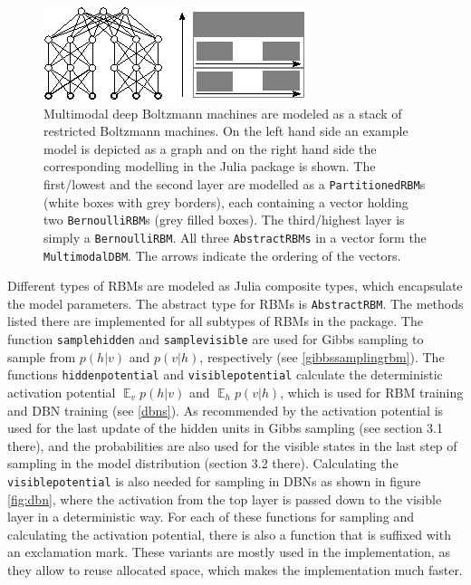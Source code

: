 \documentclass[12pt]{article}
\newcommand{\inlinecode}[1]{\texttt{#1}}
\DeclareMathOperator{\EX}{\mathbb{E}}
\begin{document}
\begin{figure}[h]
   \centering
   \includegraphics[scale=3.]{images/MDBMImpl.eps}
   \caption{Multimodal deep Boltzmann machines are modeled as a stack of restricted Boltzmann machines. On the left hand side an example model is depicted as a graph and on the right hand side the corresponding modelling in the Julia package is shown.
   The first/lowest and the second layer are modelled as a \inlinecode{PartitionedRBM}s (white boxes with grey borders), each containing a vector holding two \inlinecode{BernoulliRBM}s (grey filled boxes).
   The third/highest layer is simply a \inlinecode{BernoulliRBM}.
   All three \inlinecode{AbstractRBMs} in a vector form the \inlinecode{MultimodalDBM}.
   The arrows indicate the ordering of the vectors.}
\label{mdbmimplasstack}
\end{figure}

Different types of RBMs are modeled as Julia composite types, which encapsulate the model parameters.
The abstract type for RBMs is \inlinecode{AbstractRBM}.
The methods listed there are implemented for all subtypes of RBMs in the package.
The function \inlinecode{samplehidden} and \inlinecode{samplevisible} are used for Gibbs sampling to sample from $p(h|v)$ and $p(v|h)$, respectively (see \ref{gibbssamplingrbm}).
The functions \inlinecode{hiddenpotential} and \inlinecode{visiblepotential} calculate the deterministic activation potential $\EX_v p(h|v)$ and $\EX_h p(v|h)$, which is used for RBM training and DBN training (see \ref{dbns}).
As recommended by \cite{hinton_practical_2012} the activation potential is used for the last update of the hidden units in Gibbs sampling (see section 3.1 there), and the probabilities are also used for the visible states in the last step of sampling in the model distribution (section 3.2 there).
Calculating the \inlinecode{visiblepotential} is also needed for sampling in DBNs as shown in figure \ref{fig:dbn}, where the activation from the top layer is passed down to the visible layer in a deterministic way.
For each of these functions for sampling and calculating the activation potential, there is also a function that is suffixed with an exclamation mark.
These variants are mostly used in the implementation, as they allow to reuse allocated space, which makes the implementation much faster.
\end{document}
